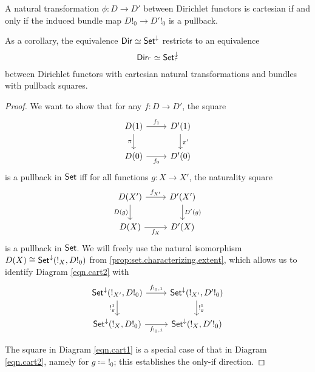 \begin{prop}\label{prop:set.dirichlet.cartesian.iff.bundle.cartesian}
A natural transformation $\phi : D \to D'$ between Dirichlet functors is
cartesian if and only if the induced bundle map $D!_0 \to D'!_0$ is a pullback.

As a corollary, the equivalence $\operatorname{\mathsf{{Dir}}} \simeq \operatorname{\mathsf{{Set}}}^{\mathbin{\downarrow}}$ restricts to an
equivalence
$$\operatorname{\mathsf{{Dir}}}_{\ulcorner} \simeq \operatorname{\mathsf{{Set}}}^{\mathbin{\downarrow}}_{\ulcorner}$$
between Dirichlet functors with cartesian natural transformations and bundles with
pullback squares.
\end{prop}
\begin{proof}
We want to show that for any $f\colon D\to D'$, the square
\begin{equation}\label{eqn.cart1}
\begin{tikzcd}
	D(1)\ar[r, "f_1"]\ar[d, "\pi"']&
	D'(1)\ar[d, "\pi'"]\\
	D(0)\ar[r, "f_0"']&
	D'(0)
\end{tikzcd}
\end{equation}
is a pullback in $\operatorname{\mathsf{{Set}}}$ iff for all functions $g\colon X\to X'$, the naturality square
\begin{equation}\label{eqn.cart2}
\begin{tikzcd}
  D(X')\ar[r, "f_{X'}"]\ar[d, "D(g)"']&
  D'(X')\ar[d, "D'(g)"]\\
  D(X)\ar[r, "f_X"']&
  D'(X)
\end{tikzcd}
\end{equation}
is a pullback in $\operatorname{\mathsf{{Set}}}$. We will freely use the natural isomorphism
$D(X)\cong\operatorname{\mathsf{{Set}}}^{\mathbin{\downarrow}}(!_X, D!_0)$ from
\cref{prop:set.characterizing.extent}, which allows us to identify Diagram
\eqref{eqn.cart2} with
\begin{equation}\label{eqn.cart3}
\begin{tikzcd}
 \Set^{\down}(!_{X'}, D!_0)     \ar[r, "f_{!_0,1}"]\ar[d, "!_g^{1}"']& \Set^{\down}(!_{X'}, D'!_0)
  \ar[d, "!_{g}^{1}"]\\
  \Set^{\down}(!_{X}, D!_0)\ar[r, "f_{!_0, 1}"']&
 \Set^{\down}(!_X, D'!_0) 
\end{tikzcd}
\end{equation}

The square in Diagram \eqref{eqn.cart1} is a
special case of that in Diagram \eqref{eqn.cart2}, namely for $g\coloneqq !_0$;
this establishes the only-if direction. 


\end{proof}
